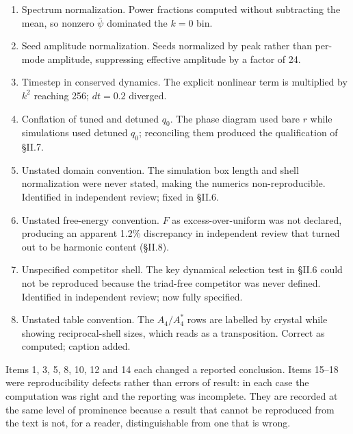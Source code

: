 \documentclass[11pt,a4paper]{article}
\begin{document}
\begin{enumerate}
\item Spectrum normalization. Power fractions computed without subtracting the mean, so nonzero $\bar{\psi}$ dominated the $k = 0$ bin.
\item Seed amplitude normalization. Seeds normalized by peak rather than per-mode amplitude, suppressing effective amplitude by a factor of 24.
\item Timestep in conserved dynamics. The explicit nonlinear term is multiplied by $k^2$ reaching 256; $dt = 0.2$ diverged.
\item Conflation of tuned and detuned $q_0$. The phase diagram used bare $r$ while simulations used detuned $q_0$; reconciling them produced the qualification of \S II.7.
\item Unstated domain convention. The simulation box length and shell normalization were never stated, making the numerics non-reproducible. Identified in independent review; fixed in \S II.6.
\item Unstated free-energy convention. $F$ as excess-over-uniform was not declared, producing an apparent 1.2\% discrepancy in independent review that turned out to be harmonic content (\S II.8).
\item Unspecified competitor shell. The key dynamical selection test in \S II.6 could not be reproduced because the triad-free competitor was never defined. Identified in independent review; now fully specified.
\item Unstated table convention. The $A_4/A_4^*$ rows are labelled by crystal while showing reciprocal-shell sizes, which reads as a transposition. Correct as computed; caption added.
\end{enumerate}
Items 1, 3, 5, 8, 10, 12 and 14 each changed a reported conclusion. Items 15--18 were reproducibility defects rather than errors of result: in each case the computation was right and the reporting was incomplete. They are recorded at the same level of prominence because a result that cannot be reproduced from the text is not, for a reader, distinguishable from one that is wrong.
\end{document}
